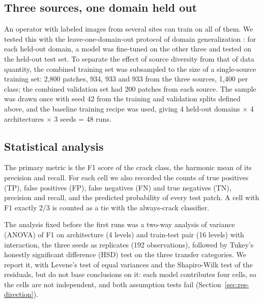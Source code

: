 \documentclass[pdflatex,sn-apa]{sn-jnl}
\begin{document}
\subsection{Three sources, one domain held out}\label{sec:multisource}

An operator with labeled images from several sites can train on all of them. We tested this with the leave-one-domain-out protocol of domain generalization \citep{zhou2023dg}: for each held-out domain, a model was fine-tuned on the other three and tested on the held-out test set. To separate the effect of source diversity from that of data quantity, the combined training set was subsampled to the size of a single-source training set: 2,800 patches, 934, 933 and 933 from the three sources, 1,400 per class; the combined validation set had 200 patches from each source. The sample was drawn once with seed 42 from the training and validation splits defined above, and the baseline training recipe was used, giving 4 held-out domains $\times$ 4 architectures $\times$ 3 seeds = 48 runs.

\subsection{Statistical analysis}\label{sec:stats}

The primary metric is the F1 score of the crack class, the harmonic mean of its precision and recall. For each cell we also recorded the counts of true positives (TP), false positives (FP), false negatives (FN) and true negatives (TN), precision and recall, and the predicted probability of every test patch. A cell with F1 exactly 2/3 is counted as a tie with the always-crack classifier.

The analysis fixed before the first runs was a two-way analysis of variance (ANOVA) of F1 on architecture (4 levels) and train-test pair (16 levels) with interaction, the three seeds as replicates (192 observations), followed by Tukey's honestly significant difference (HSD) test on the three transfer categories. We report it, with Levene's test of equal variances and the Shapiro-Wilk test of the residuals, but do not base conclusions on it: each model contributes four cells, so the cells are not independent, and both assumption tests fail (Section~\ref{sec:res-direction}).
\end{document}
